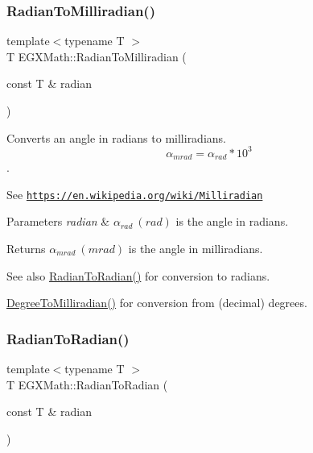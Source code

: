 \subsubsection{\texorpdfstring{Radian\+To\+Milliradian()}{RadianToMilliradian()}}
{\footnotesize\ttfamily template$<$typename T $>$ \\
T E\+G\+X\+Math\+::\+Radian\+To\+Milliradian (\begin{DoxyParamCaption}\item[{const T \&}]{radian }\end{DoxyParamCaption})}



Converts an angle in radians to milliradians. \[\alpha_{mrad}=\alpha_{rad}*10^3\]. 

See \href{https://en.wikipedia.org/wiki/Milliradian}{\tt https\+://en.\+wikipedia.\+org/wiki/\+Milliradian} 
\begin{DoxyParams}{Parameters}
{\em radian} & $\alpha_{rad}\ (rad)$ is the angle in radians. \\
\hline
\end{DoxyParams}
\begin{DoxyReturn}{Returns}
$\alpha_{mrad}\ (mrad)$ is the angle in milliradians. 
\end{DoxyReturn}
\begin{DoxySeeAlso}{See also}
\mbox{\hyperlink{group___e_g_x_math-_angle_conversions-_radian_gae08681bd86b8e7e4325f6c8cb3a0dc37}{Radian\+To\+Radian()}} for conversion to radians. 

\mbox{\hyperlink{group___e_g_x_math-_angle_conversions-_degree_gae4fa6c2d3805430760783650cfbfdb11}{Degree\+To\+Milliradian()}} for conversion from (decimal) degrees. 
\end{DoxySeeAlso}
\mbox{\label{group___e_g_x_math-_angle_conversions-_radian_gae08681bd86b8e7e4325f6c8cb3a0dc37}} 
\subsubsection{\texorpdfstring{Radian\+To\+Radian()}{RadianToRadian()}}
{\footnotesize\ttfamily template$<$typename T $>$ \\
T E\+G\+X\+Math\+::\+Radian\+To\+Radian (\begin{DoxyParamCaption}\item[{const T \&}]{radian }\end{DoxyParamCaption})}



